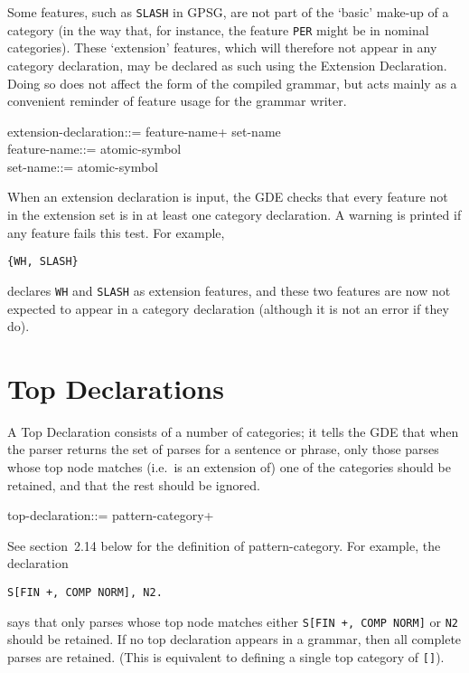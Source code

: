 Some features, such as {\tt SLASH} in GPSG, are not part of the `basic'
make-up of a category (in the way that, for instance, the feature
{\tt PER} might be in nominal categories).
These `extension' features, which will therefore not appear in any
category declaration, may be declared as such using the Extension
Declaration.  Doing so does not affect the form of the compiled grammar,
but acts mainly as a convenient reminder of feature usage for the
grammar writer.
\begin{display}
\la extension-declaration\ra ::= \lit{\{} \la feature-name\ran+ \lit{\}} \alt \la set-name\ra\\
\la feature-name\ra ::= \la atomic-symbol\ra\\
\la set-name\ra ::= \la atomic-symbol\ra
\end{display}
When an extension declaration is input, the GDE checks that every feature
not in the extension set is in at least one category declaration. A warning
is printed if any feature fails this test. For example, 
\begin{ex}
\begin{verbatim}
{WH, SLASH}
\end{verbatim}
\end{ex}
declares {\tt WH} and {\tt SLASH} as extension features, and these
two features are now not expected to appear in a category declaration
(although it is not an error if they do).

\section{Top Declarations}

A Top Declaration consists of a number of categories; it tells the
GDE that when the parser returns the
set of parses for a sentence or phrase, only those parses whose
top node matches (i.e.\ is an extension of) one of the categories
should be retained, and that the rest should be ignored.
\begin{display}
\la top-declaration\ra ::= \la pattern-category\ran+ 
\end{display}
See section~2.14 below for the definition of \la pattern-category\ran.
For example, the declaration
\begin{ex}
\begin{verbatim}
S[FIN +, COMP NORM], N2.
\end{verbatim}
\end{ex}
says that only parses whose top node matches either
{\tt S[FIN +, COMP NORM]} or {\tt N2} should be retained.
If no top declaration appears in a grammar, then all complete parses
are retained. (This is equivalent to defining a single top category
of {\tt []}). 

